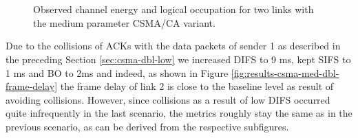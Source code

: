 \begin{figure}[tb]
	\label{fig:results-csma-med-dbl-channel-meta}
	\begin{center}
		\\
		\\
	\end{center}
	\caption{Observed channel energy and logical occupation for two links with the medium parameter CSMA/CA variant.}
\end{figure}

Due to the collisions of ACKs with the data packets of sender 1 as described in the preceding Section \ref{sec:csma-dbl-low} we increased DIFS to 9 ms, kept SIFS to 1 ms and BO to 2ms and indeed, as shown in Figure \ref{fig:results-csma-med-dbl-frame-delay} the frame delay of link 2 is close to the baseline level as result of avoiding collisions. However, since collisions as a result of low DIFS occurred quite infrequently in the last scenario, the metrics roughly stay the same as in the previous scenario, as can be derived from the respective subfigures.

